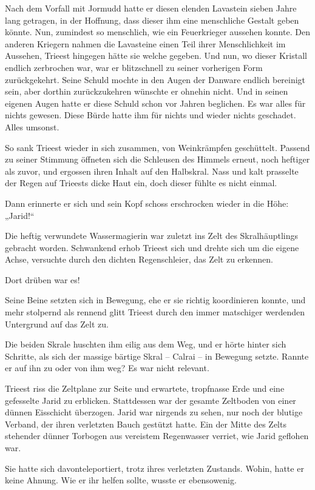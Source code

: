 Nach dem Vorfall mit Jormudd hatte er diesen elenden Lavastein sieben Jahre lang getragen, in der Hoffnung, dass dieser ihm eine menschliche Gestalt geben könnte. Nun, zumindest so menschlich, wie ein Feuerkrieger aussehen konnte. Den anderen Kriegern nahmen die Lavasteine einen Teil ihrer Menschlichkeit im Aussehen, Trieest hingegen hätte sie welche gegeben. Und nun, wo dieser Kristall endlich zerbrochen war, war er blitzschnell zu seiner vorherigen Form zurückgekehrt. Seine Schuld mochte in den Augen der Danware endlich bereinigt sein, aber dorthin zurückzukehren wünschte er ohnehin nicht. Und in seinen eigenen Augen hatte er diese Schuld schon vor Jahren beglichen. Es war alles für nichts gewesen. Diese Bürde hatte ihm für nichts und wieder nichts geschadet. Alles umsonst.

So sank Trieest wieder in sich zusammen, von Weinkrämpfen geschüttelt. Passend zu seiner Stimmung öffneten sich die Schleusen des Himmels erneut, noch heftiger als zuvor, und ergossen ihren Inhalt auf den Halbskral. Nass und kalt prasselte der Regen auf Trieests dicke Haut ein, doch dieser fühlte es nicht einmal.

Dann erinnerte er sich und sein Kopf schoss erschrocken wieder in die Höhe: „Jarid!“

Die heftig verwundete Wassermagierin war zuletzt ins Zelt des Skralhäuptlings gebracht worden. Schwankend erhob Trieest sich und drehte sich um die eigene Achse, versuchte durch den dichten Regenschleier, das Zelt zu erkennen.

Dort drüben war es!

Seine Beine setzten sich in Bewegung, ehe er sie richtig koordinieren konnte, und mehr stolpernd als rennend glitt Trieest durch den immer matschiger werdenden Untergrund auf das Zelt zu.

Die beiden Skrale huschten ihm eilig aus dem Weg, und er hörte hinter sich Schritte, als sich der massige bärtige Skral – Calrai – in Bewegung setzte. Rannte er auf ihn zu oder von ihm weg? Es war nicht relevant.

Trieest riss die Zeltplane zur Seite und erwartete, tropfnasse Erde und eine gefesselte Jarid zu erblicken. Stattdessen war der gesamte Zeltboden von einer dünnen Eisschicht überzogen. Jarid war nirgends zu sehen, nur noch der blutige Verband, der ihren verletzten Bauch gestützt hatte. Ein der Mitte des Zelts stehender dünner Torbogen aus vereistem Regenwasser verriet, wie Jarid geflohen war.

Sie hatte sich davonteleportiert, trotz ihres verletzten Zustands. Wohin, hatte er keine Ahnung. Wie er ihr helfen sollte, wusste er ebensowenig.

